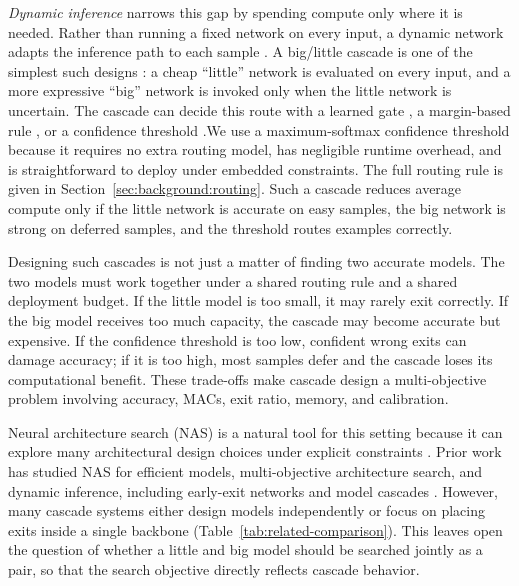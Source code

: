 \documentclass[conference]{IEEEtran}
\begin{document}
\emph{Dynamic inference} narrows this gap by spending compute only where it
is needed. Rather than running a fixed network on every input, a dynamic
network adapts the inference path to each sample
\cite{han2021dynamic,bolukbasi2017adaptive}. A big/little cascade is one of
the simplest such designs \cite{park2015biglittle}: a cheap ``little''
network is evaluated on every input, and a more expressive ``big'' network
is invoked only when the little network is uncertain. The cascade can decide
this route with a learned gate \cite{regol2024jeidnn,wang2018skipnet}, a
margin-based rule \cite{bolukbasi2017adaptive}, or a confidence threshold
\cite{teerapittayanon2017branchynet,kaya2019shallowdeep}.We use a
maximum-softmax confidence threshold because it requires no extra routing
model, has negligible runtime overhead, and is straightforward to deploy
under embedded constraints. The full routing rule is given in
Section~\ref{sec:background:routing}. Such a cascade reduces average compute
only if the little network is accurate on easy samples, the big network is
strong on deferred samples, and the threshold routes examples correctly.

Designing such cascades is not just a matter of finding two accurate
models. The two models must work together under a shared routing rule and a
shared deployment budget. If the little model is too small, it may rarely exit
correctly. If the big model receives too much capacity, the cascade may become
accurate but expensive. If the confidence threshold is too low, confident
wrong exits can damage accuracy; if it is too high, most samples defer and the
cascade loses its computational benefit. These trade-offs make cascade design a
multi-objective problem involving accuracy, MACs, exit ratio, memory, and
calibration.

Neural architecture search (NAS) is a natural tool for this setting because it
can explore many architectural design choices under explicit constraints
\cite{elsken2019nassurvey}. Prior work has studied NAS for efficient models,
multi-objective architecture search, and dynamic inference, including early-exit
networks and model cascades \cite{deb2002nsga2,lu2019nsganet,chebykin2022encas}.
However, many cascade systems either design models independently or focus on
placing exits inside a single backbone (Table~\ref{tab:related-comparison}).
This leaves open the question of whether
a little and big model should be searched jointly as a pair, so that the search
objective directly reflects cascade behavior.
\end{document}
